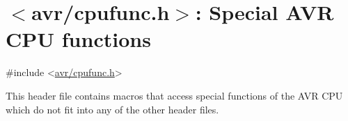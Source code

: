 \hypertarget{group__avr__cpufunc}{}\section{$<$avr/cpufunc.h$>$\+: Special A\+VR C\+PU functions}
\label{group__avr__cpufunc}

\begin{DoxyCode}
\textcolor{preprocessor}{#include <\hyperlink{cpufunc_8h}{avr/cpufunc.h}>} 
\end{DoxyCode}


This header file contains macros that access special functions of the A\+VR C\+PU which do not fit into any of the other header files. 
